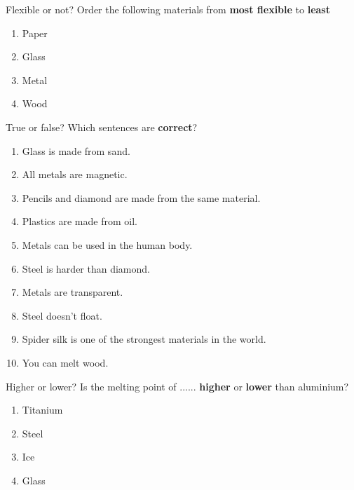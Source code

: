 \documentclass[a4paper, 12pt]{article}
\begin{document}
	\pagestyle{empty}
	\begin{question}[colback=yellow!10]{Flexible or not?}
  		Order the following materials from \textbf{most flexible} to \textbf{least}
  		
  		\begin{enumerate}[font=\bfseries]
  		\centering
  			\item Paper
  			\item Glass
  			\item Metal
  			\item Wood
  		\end{enumerate}
	\end{question}
	\begin{question}[colback=red!10]{True or false?}
  		Which sentences are \textbf{correct}?
  		
  		\begin{multicols}{2}
  		\begin{enumerate}[font=\bfseries]
  			\item Glass is made from sand.
  			\item All metals are magnetic.
  			\item Pencils and diamond are made from the same material.
  			\item Plastics are made from oil.
  			\item Metals can be used in the human body.
  			\item Steel is harder than diamond.
  			\item Metals are transparent.
  			\item Steel doesn’t float.
  			\item Spider silk is one of the strongest materials in the world.
  			\item You can melt wood.
  		\end{enumerate}
  		\end{multicols}
	\end{question}
	\newpage
	\begin{question}[colback=blue!10]{Higher or lower?}
  		Is the melting point of ...... \textbf{higher} or \textbf{lower} than aluminium?
  		\begin{enumerate}
  		\centering
  			\item Titanium
  			\item Steel
  			\item Ice
  			\item Glass
  		\end{enumerate}
	\end{question}
\end{document}
